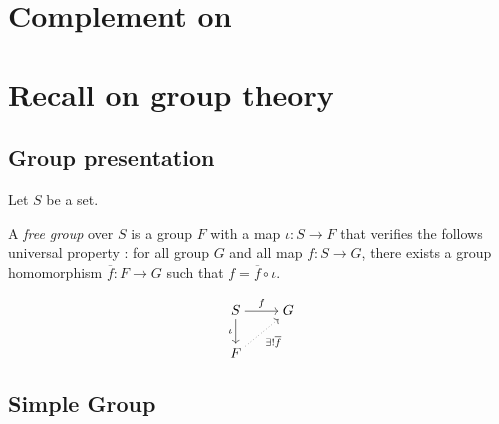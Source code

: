 \section{Complement on \Lean}%
\label{sec:ComplementLean}


\section{Recall on group theory}

\subsection{Group presentation}
\label{sub:presentation}

Let $S$ be a set.
\begin{definition}
    A \emph{free group} over $S$ is a group $F$ with a map $\iota : S \to  F$ that verifies the follows universal property : for all group $G$ and all map $f : S \to  G$, there exists a group homomorphism $\overline{f} : F \to  G$ such that $f  = \overline{f} \circ \iota$.


\end{definition}
\[\begin{tikzcd}[cramped]
	S & G \\
	F
	\arrow["f", from=1-1, to=1-2]
	\arrow["\iota"', from=1-1, to=2-1]
	\arrow["{\exists ! \overline{f}}"', dotted, from=2-1, to=1-2]
\end{tikzcd}\]

\subsection{Simple Group}
